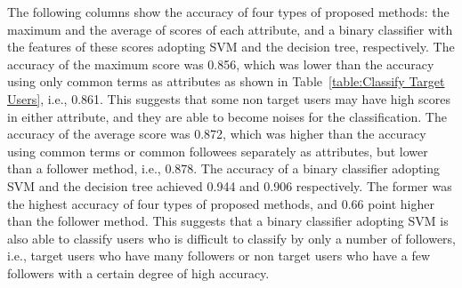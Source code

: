 The following columns show the accuracy of four types of proposed
methods: the maximum and the average of scores of each attribute,
and a binary classifier with the features of these scores adopting
SVM and the decision tree, respectively.  The accuracy of the
maximum score was 0.856, which was lower than the accuracy using only
common terms as attributes as shown in Table~\ref{table:Classify Target
Users}, i.e., 0.861.  This suggests that some non
target users may have high scores in either attribute, and they are able
to become noises for the classification.  The accuracy of the average
score was 0.872, which was higher than the accuracy using common
terms or common followees separately as attributes, but lower than a follower
method, i.e., 0.878.  The accuracy of a binary classifier adopting SVM and the
decision tree achieved 0.944 and 0.906 respectively.  The former was the
highest accuracy of four types of proposed methods, and 0.66
point higher than the follower method.  This suggests that a binary classifier
adopting SVM is also able to classify users who is difficult to classify by
only a number of followers, i.e., target users who have many followers or non
target users who have a few followers with a certain degree of high accuracy.

